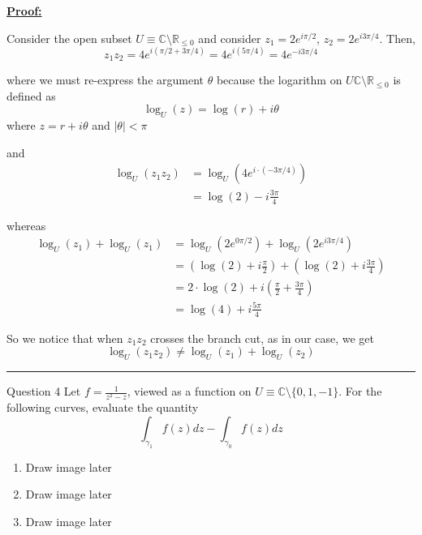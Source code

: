 \documentclass{article}
\newcommand{\R}{\mathbb{R}}
\newcommand{\C}{\mathbb{C}}
\begin{document}
\vskip 0.5cm
\underline{\textbf{Proof:}}

Consider the open subset $U \equiv \C \setminus \R_{\leq 0}$ and consider $z_1 = 2e^{i \pi/2}$, $z_2 = 2e^{i 3\pi/4}$. Then, 
\[ z_1 z_2 = 4 e^{i \left(\pi/2 + 3\pi/4 \right)} = 4 e^{i \left(5\pi/4 \right)} = 4e^{-i3\pi/4} \]

where we must re-express the argument $\theta$ because the logarithm on $U \C \setminus \R_{\leq 0}$ is defined as 
\[ \log_U(z) = \log(r) + i\theta \]
where $z = r + i\theta$ and $\left| \theta \right| < \pi$

and 
\begin{align*}
  \log_U(z_1z_2) &= \log_U(4e^{i \cdot \left(-3\pi/4\right)}) \\
  &= \log(2) - i\frac{3\pi}{4}
\end{align*}

whereas 
\begin{align*}
  \log_U\left(z_1\right) + \log_U\left(z_1\right) &= \log_U\left(2e^{0\pi/2}\right) + \log_U\left(2e^{i3\pi/4}\right) \\
  &= \left( \log(2) + i\frac{\pi}{2} \right) + \left( \log(2) + i\frac{3\pi}{4}\right) \\
  &= 2 \cdot \log(2) + i \left( \frac{\pi}{2} + \frac{3\pi}{4}\right) \\
  &= \log(4) + i \frac{5\pi}{4}
\end{align*}

So we notice that when $z_1z_2$ crosses the branch cut, as in our case, we get 
\[ \log_U\left(z_1 z_2\right) \neq \log_U \left(z_1\right) + \log_U \left(z_2\right) \]


\vskip 0.5cm
\hrule 
\vskip 0.5cm


\begin{mathdefinitionbox}{Question 4}
\vskip 0.5cm
Let $f = \frac{1}{z^2 - z}$, viewed as a function on $U \equiv \C \setminus \{0, 1, -1\}$. For the following curves, evaluate the quantity 
\[  \int_{{\gamma_1}} f(z) dz -  \int_{{\gamma_0}} f(z) dz  \]
\begin{enumerate}[label=(\alph*)]
  \item Draw image later
  \item Draw image later
  \item Draw image later
\end{enumerate}

\end{mathdefinitionbox}
\end{document}
